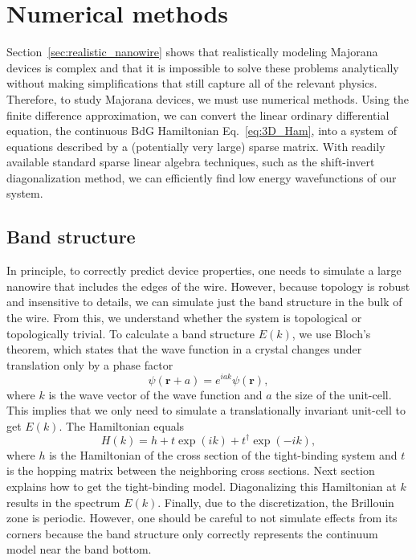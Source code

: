 \section{Numerical methods}\label{sec:numerical_methods}
Section~\ref{sec:realistic_nanowire} shows that realistically modeling Majorana devices is complex and that it is impossible to solve these problems analytically without making simplifications that still capture all of the relevant physics.
Therefore, to study Majorana devices, we must use numerical methods.
Using the finite difference approximation, we can convert the linear ordinary differential equation, the continuous BdG Hamiltonian Eq.~\eqref{eq:3D_Ham}, into a system of equations described by a (potentially very large) sparse matrix.
With readily available standard sparse linear algebra techniques, such as the shift-invert diagonalization method, we can efficiently find low energy wavefunctions of our system.

\subsection{Band structure}\label{sec:band_structure_numerics}
In principle, to correctly predict device properties, one needs to simulate a large nanowire that includes the edges of the wire.
However, because topology is robust and insensitive to details, we can simulate just the band structure in the bulk of the wire.
From this, we understand whether the system is topological or topologically trivial.
To calculate a band structure $E(k)$, we use Bloch's theorem, which states that the wave function in a crystal changes under translation only by a phase factor
\begin{equation}
\psi(\bm{r}+a) = e^{i a k}\psi(\bm{r}),
\end{equation}
where $k$ is the wave vector of the wave function and $a$ the size of the unit-cell.
This implies that we only need to simulate a translationally invariant unit-cell to get $E(k)$.
The Hamiltonian equals
\begin{equation}
H\left(k\right) = h + t\exp(ik) + t^{\dagger}\exp(-ik),
\end{equation}
where $h$ is the Hamiltonian of the cross section of the tight-binding system and $t$ is the hopping matrix between the neighboring cross sections.
Next section explains how to get the tight-binding model.
Diagonalizing this Hamiltonian at $k$ results in the spectrum $E(k)$.
Finally, due to the discretization, the Brillouin zone is periodic.
However, one should be careful to not simulate effects from its corners because the band structure only correctly represents the continuum model near the band bottom.

